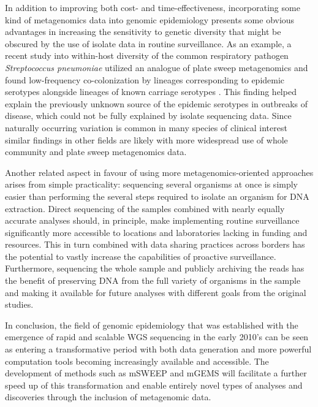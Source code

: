 \documentclass[officiallayout]{tktla}
\begin{document}
In addition to improving both cost- and time-effectiveness,
incorporating some kind of metagenomics data into genomic epidemiology
presents some obvious advantages in increasing the sensitivity to
genetic diversity that might be obscured by the use of isolate data in
routine surveillance. As an example, a recent study into within-host
diversity of the common respiratory pathogen \textit{Streptococcus
  pneumoniae} utilized an analogue of plate sweep metagenomics and
found low-frequency co-colonization by lineages corresponding to
epidemic serotypes alongside lineages of known carriage serotypes
\citep{tonkin-hill_pneumococcal_2022}. This finding helped explain the
previously unknown source of the epidemic serotypes in outbreaks of
disease, which could not be fully explained by isolate sequencing
data. Since naturally occurring variation is common in many species of
clinical interest \citep{paterson2015capturing, zlitni2020strain,
  dixit2018within, mosavie2019sampling, tonkin-hill_pneumococcal_2022}
similar findings in other fields are likely with more widespread use
of whole community and plate sweep metagenomics data.

Another related aspect in favour of using more metagenomics-oriented
approaches arises from simple practicality: sequencing several
organisms at once is simply easier than performing the several steps
required to isolate an organism for DNA extraction. Direct sequencing
of the samples combined with nearly equally accurate analyses should,
in principle, make implementing routine surveillance significantly
more accessible to locations and laboratories lacking in funding and
resources. This in turn combined with data sharing practices across
borders has the potential to vastly increase the capabilities of
proactive surveillance. Furthermore, sequencing the whole sample and
publicly archiving the reads has the benefit of preserving DNA from
the full variety of organisms in the sample and making it available
for future analyses with different goals from the original studies.

In conclusion, the field of genomic epidemiology that was established
with the emergence of rapid and scalable WGS sequencing in the early
2010's can be seen as entering a transformative period with both data
generation and more powerful computation tools becoming increasingly
available and accessible. The development of methods such as mSWEEP
and mGEMS will facilitate a further speed up of this transformation and
enable entirely novel types of analyses and discoveries through the
inclusion of metagenomic data.
\end{document}
